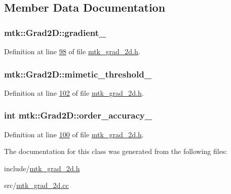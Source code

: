 \subsection{Member Data Documentation}
\hypertarget{classmtk_1_1Grad2D_a22b5ad8454b013e365257dcae04d87a4}{
\subsubsection[{gradient\+\_\+}]{ mtk\+::\+Grad2\+D\+::gradient\+\_\+\hspace{0.3cm}{\ttfamily [private]}}}\label{classmtk_1_1Grad2D_a22b5ad8454b013e365257dcae04d87a4}


Definition at line \hyperlink{mtk__grad__2d_8h_source_l00098}{98} of file \hyperlink{mtk__grad__2d_8h_source}{mtk\+\_\+grad\+\_\+2d.\+h}.

\hypertarget{classmtk_1_1Grad2D_a2bc4debde55eb2c2bc50cef7ceb60cfd}{
\subsubsection[{mimetic\+\_\+threshold\+\_\+}]{ mtk\+::\+Grad2\+D\+::mimetic\+\_\+threshold\+\_\+\hspace{0.3cm}{\ttfamily [private]}}}\label{classmtk_1_1Grad2D_a2bc4debde55eb2c2bc50cef7ceb60cfd}


Definition at line \hyperlink{mtk__grad__2d_8h_source_l00102}{102} of file \hyperlink{mtk__grad__2d_8h_source}{mtk\+\_\+grad\+\_\+2d.\+h}.

\hypertarget{classmtk_1_1Grad2D_ab028aa2889a2f5d59f52e01691b1b9eb}{
\subsubsection[{order\+\_\+accuracy\+\_\+}]{\setlength{\rightskip}{0pt plus 5cm}int mtk\+::\+Grad2\+D\+::order\+\_\+accuracy\+\_\+\hspace{0.3cm}{\ttfamily [private]}}}\label{classmtk_1_1Grad2D_ab028aa2889a2f5d59f52e01691b1b9eb}


Definition at line \hyperlink{mtk__grad__2d_8h_source_l00100}{100} of file \hyperlink{mtk__grad__2d_8h_source}{mtk\+\_\+grad\+\_\+2d.\+h}.



The documentation for this class was generated from the following files\+:\begin{DoxyCompactItemize}
\item 
include/\hyperlink{mtk__grad__2d_8h}{mtk\+\_\+grad\+\_\+2d.\+h}\item 
src/\hyperlink{mtk__grad__2d_8cc}{mtk\+\_\+grad\+\_\+2d.\+cc}\end{DoxyCompactItemize}
